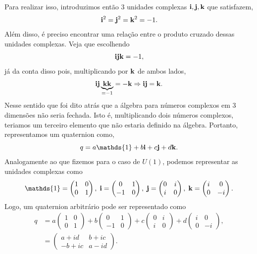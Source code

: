 \documentclass{article}
\numberwithin{equation}{section}
\numberwithin{figure}{section}
\begin{document}
Para realizar isso, introduzimos então 3 unidades complexas $\vb{i},\vb{j},\vb{k}$ que satisfazem, 
\begin{equation}
	\vb{i}^2=\vb{j}^2=\vb{k}^2=-1.
\end{equation}
Além disso, é preciso encontrar uma relação entre o produto cruzado dessas unidades complexas. Veja que escolhendo 
\begin{equation}
	\vb{i}\vb{j}\vb{k}=-1,
\end{equation}
já da conta disso pois, multiplicando por $\vb{k}$ de ambos lados,
\begin{equation}
	\vb{i}\vb{j}\underbrace{\vb{k}\vb{k}}_{=-1}=-\vb{k}\Rightarrow \vb{i}\vb{j}=\vb{k}.
\end{equation}
Nesse sentido que foi dito atrás que a álgebra para números complexos em 3 dimensões não seria fechada. Isto é, multiplicando dois números complexos, teriamos um terceiro elemento que não estaria definido na álgebra. Portanto, representamos um quaternion como, 
\begin{equation}
	q=a\mathds{1}+b\vb{i}+c\vb{j}+d\vb{k}.
\end{equation}
Analogamente ao que fizemos para o caso de $U(1)$, podemos representar as unidades complexas como 
\begin{equation}
	\mathds{1}=\begin{pmatrix}
		1 & 0 \\
		0 & 1
	\end{pmatrix},\;\vb{i}=\begin{pmatrix}
	0 & 1 \\
	-1 & 0
	\end{pmatrix},\;\vb{j}=\begin{pmatrix}
	0 & i \\
	i & 0
	\end{pmatrix},\;\vb{k}=\begin{pmatrix}
	i & 0 \\
	0 & -i
	\end{pmatrix}.
\end{equation}
Logo, um quaternion arbitrário pode ser representado como 
\begin{equation}
\begin{split}
		q&=a\begin{pmatrix}
		1 & 0 \\
		0 & 1
	\end{pmatrix}+b\begin{pmatrix}
		0 & 1 \\
		-1 & 0
	\end{pmatrix}+c\begin{pmatrix}
		0 & i \\
		i & 0
	\end{pmatrix}+d\begin{pmatrix}
		i & 0 \\
		0 & -i
	\end{pmatrix},\\&=\begin{pmatrix}
	a+id & b+ic \\
	-b+ic & a-id
	\end{pmatrix}.
\end{split}
\end{equation}
\end{document}
